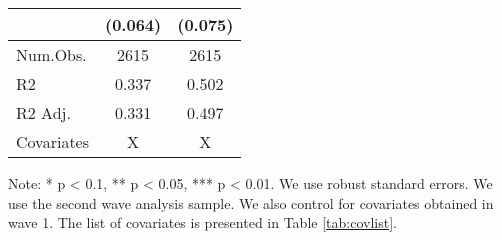\begin{table}
\begin{threeparttable}
\begin{tabular}[t]{lcc}
 & (\num{0.064}) & (\num{0.075})\\
\midrule
Num.Obs. & \num{2615} & \num{2615}\\
R2 & \num{0.337} & \num{0.502}\\
R2 Adj. & \num{0.331} & \num{0.497}\\
Covariates & X & X\\
\bottomrule
\end{tabular}
\begin{tablenotes}
\item Note: * p < 0.1, ** p < 0.05, *** p < 0.01. We use robust standard errors. We use the second wave analysis sample. We also control for covariates obtained in wave 1. The list of covariates is presented in Table \ref{tab:covlist}.
\end{tablenotes}
\end{threeparttable}
\end{table}

